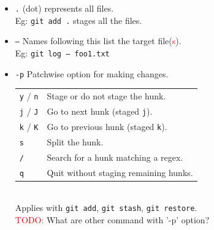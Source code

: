 \begin{itemize}
\item \texttt{.} (dot) represents all files.\\
        Eg: \texttt{git add .} stages all the files.\\
\item \texttt{--} Names following this list the target 
        file(\textcolor{red}{s}).\\
        Eg: \texttt{git log -- foo1.txt}\\
\item \texttt{-p} Patchwise option for making changes.\\
        \begin{tabular}{l|l}
        \texttt{y} / \texttt{n} & Stage or do not stage the hunk.\\
        \texttt{j} / \texttt{J} & Go to next hunk (staged \texttt{j}).\\
        \texttt{k} / \texttt{K} & Go to previous hunk (staged \texttt{k}).\\
        \texttt{s} & Split the hunk.\\
        \texttt{/} & Search for a hunk matching a regex.\\
        \texttt{q} & Quit without staging remaining hunks.\\
        \end{tabular} \\
        Applies with \texttt{git add}, \texttt{git stash},
        \texttt{git restore}.\\
        \textcolor{red}{TODO:} What are other command with '-p' option?
\end{itemize}


\vfill\null
\columnbreak

\begin{tabularx}{\linewidth}{lX}
   \hline 
\end{tabularx}


